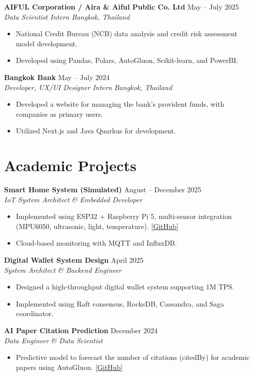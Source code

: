 \documentclass[a4paper,10pt]{article}
\newcommand{\entry}[4]{
  \vspace{1.2ex}
  \textbf{#1} \hfill #2 \\
  \textit{#3} \hfill \textit{#4} \par
}
\newcommand{\project}[3]{
  \vspace{1.2ex}
  \textbf{#1} \hfill #2 \\
  \textit{#3} \par
}
\begin{document}
\entry{AIFUL Corporation / Aira \& Aiful Public Co. Ltd}{May -- July 2025}{Data Scientist Intern}{Bangkok, Thailand}
\begin{itemize}
    \item National Credit Bureau (NCB) data analysis and credit risk assessment model development.
    \item Developed using Pandas, Polars, AutoGluon, Scikit-learn, and PowerBI.
\end{itemize}

\entry{Bangkok Bank}{May -- July 2024}{Developer, UX/UI Designer Intern}{Bangkok, Thailand}
\begin{itemize}
    \item Developed a website for managing the bank's provident funds, with companies as primary users.
    \item Utilized Next.js and Java Quarkus for development.
\end{itemize}

\section*{Academic Projects}

\project{Smart Home System (Simulated)}{August -- December 2025}{IoT System Architect \& Embedded Developer}
\begin{itemize}
    \item Implemented using ESP32 + Raspberry Pi 5, multi-sensor integration (MPU6050, ultrasonic, light, temperature). [\href{https://github.com/Chulinuwu/Smart_Farm_Plant_Monitoring_System}{GitHub}]
    \item Cloud-based monitoring with MQTT and InfluxDB.
\end{itemize}

\project{Digital Wallet System Design}{April 2025}{System Architect \& Backend Engineer}
\begin{itemize}
    \item Designed a high-throughput digital wallet system supporting 1M TPS.
    \item Implemented using Raft consensus, RocksDB, Cassandra, and Saga coordinator.
\end{itemize}

\project{AI Paper Citation Prediction}{December 2024}{Data Engineer \& Data Scientist}
\begin{itemize}
    \item Predictive model to forecast the number of citations (citedBy) for academic papers using AutoGluon. [\href{https://github.com/Chulinuwu/ArticlePopularityPrediction}{GitHub}]
\end{itemize}
\end{document}

